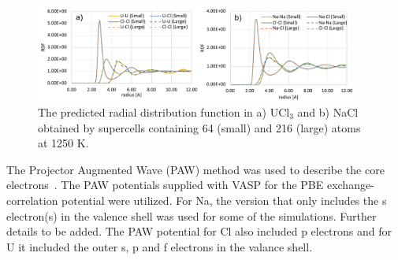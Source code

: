\documentclass[preprint,3p,10pt,twocolumn,number,sort&compress]{elsarticle}
\begin{document}
\begin{figure}[htb]
\centering
\includegraphics[width=0.95\textwidth]{FIG1_0.pdf}
\caption{The predicted radial distribution function in a) UCl$_3$ and b) NaCl obtained by supercells containing 64 (small) and 216 (large) atoms at 1250 K.} 
\label{fig:radial}
\end{figure}

The Projector Augmented Wave (PAW) method was used to describe the core electrons~\cite{PAW1,PAW2}. The PAW potentials supplied with VASP for the PBE exchange-correlation potential were utilized. For Na, the version that only includes the s electron(s) in the valence shell was used for some of the simulations. {\color{red} Further details to be added.} %
The PAW potential for Cl also included p electrons and for U it included the outer s, p and f electrons in the valance shell. %
\end{document}
